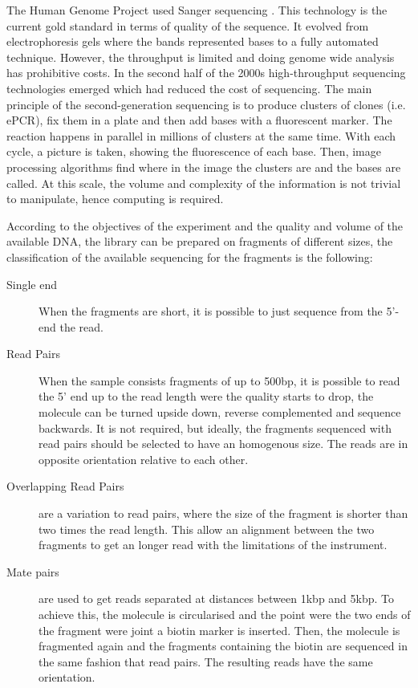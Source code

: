 The Human Genome Project used Sanger sequencing \cite{Lander2001}. This technology is the current gold standard in terms of quality of the sequence. It evolved from electrophoresis gels where the bands represented bases to a fully automated technique. However, the throughput is limited and doing genome wide analysis has prohibitive costs. In the second half of the 2000s high-throughput sequencing technologies emerged which had reduced the cost of sequencing. The main principle of the second-generation sequencing is to produce clusters of clones (i.e. ePCR), fix them in a plate and then add bases with a fluorescent marker. The reaction happens in parallel in millions of clusters at the same time. With each cycle, a picture is taken, showing the fluorescence of each base. Then, image processing algorithms find where in the image the clusters are and the bases are called. At this scale, the volume and complexity of the information is not trivial to manipulate, hence computing is required. 


According to the objectives of the experiment and the quality and volume of the available DNA, the library can be prepared on fragments of different sizes, the classification of the available sequencing for the fragments is the following\cite{Myllykangas2012,Metzker2010,Shendure2008,Hutchison2007}:

\begin{description}
\item[Single end] When the fragments are short, it is possible to just sequence from the 5'-end the read.
\item[Read Pairs] When the sample consists fragments of up to 500bp, it is possible to read the 5' end up to the read length were the quality starts to drop, the molecule can be turned upside down, reverse complemented and sequence backwards. It is not required, but ideally, the fragments sequenced with read pairs should be selected to have an homogenous size. The reads are in opposite orientation relative to each other. 
\item[Overlapping Read Pairs] are a variation to read pairs, where the size of the fragment is shorter than two times the read length. This allow an alignment between the two fragments to get an longer read with the limitations of the instrument.
\item[Mate pairs]  are used to get reads separated at distances between 1kbp and 5kbp. To achieve this, the molecule is circularised and the point were the two ends of the fragment were joint a biotin marker is inserted. Then, the molecule is fragmented again and the fragments containing the biotin are sequenced in the same fashion that read pairs. The resulting reads have the same orientation.
\end{description}


